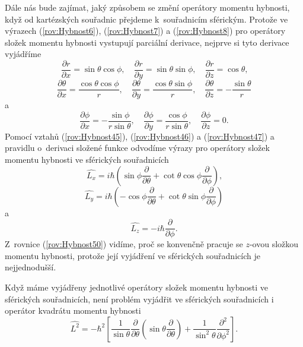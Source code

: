 Dále nás bude zajímat, jaký způsobem se změní operátory momentu hybnosti, když od kartézských souřadnic přejdeme k~souřadnicím sférickým. Protože ve výrazech (\ref{rov:Hybnost6}), (\ref{rov:Hybnost7}) a (\ref{rov:Hybnost8}) pro operátory složek momentu hybnosti vystupují parciální derivace, nejprve si tyto derivace vyjádříme
\begin{equation}
\frac{\partial r}{\partial x} = \sin \theta \cos \phi, \quad \frac{\partial r}{\partial y} = \sin \theta \sin \phi, \quad \frac{\partial r}{\partial z} = \cos \theta \mbox{,}
\label{rov:Hybnost45}
\end{equation}
\begin{equation}
\frac{\partial \theta}{\partial x} = \frac{\cos \theta \cos \phi}{r}, \quad \frac{\partial \theta}{\partial y} = \frac{\cos \theta \sin \phi}{r}, \quad \frac{\partial \theta}{\partial z} = -\frac{\sin \theta}{r}
\label{rov:Hybnost46}
\end{equation}
a
\begin{equation}
\frac{\partial \phi}{\partial x} = -\frac{\sin \phi}{r \sin \theta}, \quad \frac{\partial \phi}{\partial y} = \frac{\cos \phi}{r \sin \theta}, \quad \frac{\partial \phi}{\partial z} = 0 \mbox{.}
\label{rov:Hybnost47}
\end{equation}
Pomocí vztahů (\ref{rov:Hybnost45}), (\ref{rov:Hybnost46}) a (\ref{rov:Hybnost47}) a pravidlu o~derivaci složené funkce odvodíme výrazy pro operátory složek momentu hybnosti ve sférických souřadnicích
\begin{equation}
\hat{L_x}= i \hbar \left( \sin \phi \frac{\partial}{\partial \theta} + \cot \theta \cos \phi \frac{\partial}{\partial \phi} \right) \mbox{,}
\label{rov:Hybnost48}
\end{equation}
\begin{equation}
\hat{L_y}= i \hbar \left( -\cos \phi \frac{\partial}{\partial \theta} + \cot \theta \sin \phi \frac{\partial}{\partial \phi} \right)
\label{rov:Hybnost49}
\end{equation}
a
\begin{equation}
\hat{L_z}= -i \hbar \frac{\partial}{\partial \phi} \mbox{.}
\label{rov:Hybnost50}
\end{equation}
Z~rovnice (\ref{rov:Hybnost50}) vidíme, proč se konvenčně pracuje se $z$-ovou složkou momentu hybnosti, protože její vyjádření ve sférických souřadnicích je nejjednodušší.

Když máme vyjádřeny jednotlivé operátory složek momentu hybnosti ve sférických souřadnicích, není problém vyjádřit ve sférických souřadnicích i operátor kvadrátu momentu hybnosti
\begin{equation}
\hat{L^2} = - \hbar^2 \left[ \frac{1}{\sin \theta} \frac{\partial}{\partial \theta} \left(\sin \theta \frac{\partial}{\partial \theta} \right) + \frac{1}{\sin^2 \theta}\frac{\partial^2}{\partial \phi^2} \right] \mbox{.}
\label{rov:Hybnost51}
\end{equation}

